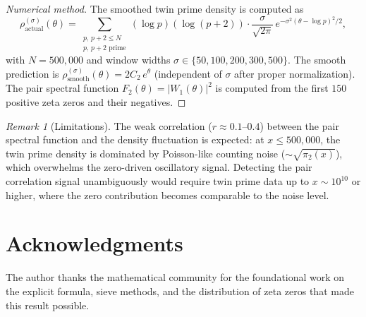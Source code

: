 \documentclass[11pt,a4paper]{article}
\theoremstyle{remark}
\newtheorem{remark}[theorem]{Remark}
\begin{document}
\begin{proof}[Numerical method]
The smoothed twin prime density is computed as
\[
\rho_{\mathrm{actual}}^{(\sigma)}(\theta) = \sum_{\substack{p,\,p+2\le N \\ p,\,p+2\text{ prime}}} (\log p)(\log(p+2))\cdot\frac{\sigma}{\sqrt{2\pi}}\,e^{-\sigma^2(\theta-\log p)^2/2},
\]
with $N = 500{,}000$ and window widths $\sigma \in \{50, 100, 200, 300, 500\}$.
The smooth prediction is $\rho_{\mathrm{smooth}}^{(\sigma)}(\theta) = 2C_2\,e^{\theta}$ (independent of $\sigma$ after proper normalization).
The pair spectral function $F_2(\theta) = |W_1(\theta)|^2$ is computed from the first $150$ positive zeta zeros and their negatives.
\end{proof}

\begin{remark}[Limitations]
The weak correlation ($r \approx 0.1$--$0.4$) between the pair spectral function and the density fluctuation is expected: at $x \le 500{,}000$, the twin prime density is dominated by Poisson-like counting noise ($\sim\sqrt{\pi_2(x)}$), which overwhelms the zero-driven oscillatory signal.
Detecting the pair correlation signal unambiguously would require twin prime data up to $x \sim 10^{10}$ or higher, where the zero contribution becomes comparable to the noise level.
\end{remark}

\section*{Acknowledgments}

The author thanks the mathematical community for the foundational work on the explicit formula, sieve methods, and the distribution of zeta zeros that made this result possible.

\end{document}
